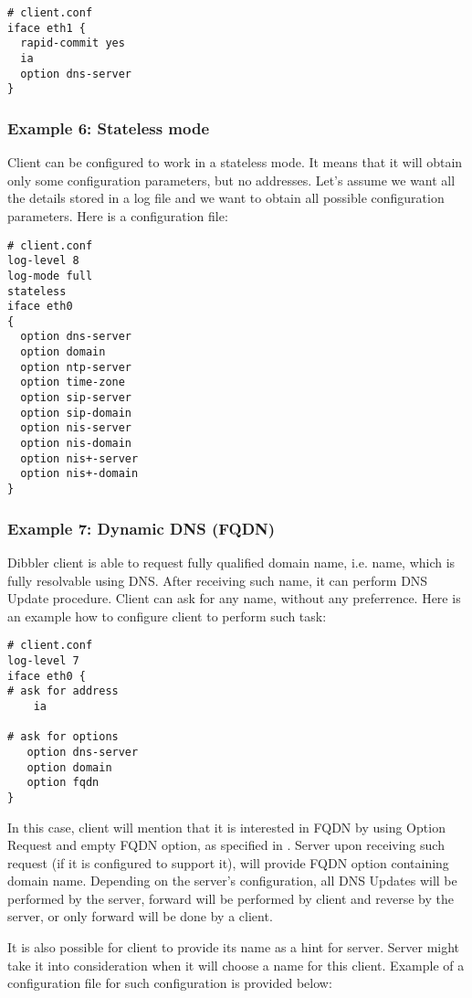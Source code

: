 \begin{lstlisting}
# client.conf
iface eth1 {
  rapid-commit yes
  ia 
  option dns-server
}
\end{lstlisting}

\subsubsection{Example 6: Stateless mode}
Client can be configured to work in a stateless mode. It means that it
will obtain only some configuration parameters, but no
addresses. Let's assume we want all the details stored in a log file and
we want to obtain all possible configuration parameters. Here is a
configuration file:

\begin{lstlisting}
# client.conf
log-level 8
log-mode full
stateless
iface eth0
{
  option dns-server
  option domain
  option ntp-server
  option time-zone
  option sip-server
  option sip-domain
  option nis-server
  option nis-domain
  option nis+-server
  option nis+-domain
}
\end{lstlisting}

\subsubsection{Example 7: Dynamic DNS (FQDN)}
\label{example-client-fqdn}
Dibbler client is able to request fully qualified domain name,
i.e. name, which is fully resolvable using DNS. After receiving such
name, it can perform DNS Update procedure. Client can ask for any
name, without any preferrence. Here is an example how to configure
client to perform such task:
\begin{lstlisting}
# client.conf
log-level 7
iface eth0 {
# ask for address
    ia

# ask for options
   option dns-server
   option domain
   option fqdn
}
\end{lstlisting}

In this case, client will mention that it is interested in FQDN by
using Option Request and empty FQDN option, as specified in
\cite{rfc4704}. Server upon receiving such request (if it is
configured to support it), will provide FQDN option containing domain
name. Depending on the server's configuration, all DNS Updates will be
performed by the server, forward will be performed by client and reverse
by the server, or only forward will be done by a client.

It is also possible for client to provide its name as a hint for
server. Server might take it into consideration when it will choose a
name for this client. Example of a configuration file for such
configuration is provided below:

